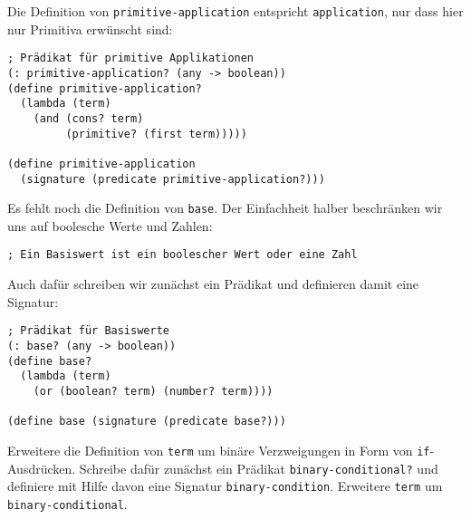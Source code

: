 %
Die Definition von \lstinline{primitive-application} entspricht
\lstinline{application}, nur dass hier nur Primitiva erwünscht sind:
%
\begin{lstlisting}
; Prädikat für primitive Applikationen
(: primitive-application? (any -> boolean))
(define primitive-application?
  (lambda (term)
    (and (cons? term)
         (primitive? (first term)))))

(define primitive-application 
  (signature (predicate primitive-application?)))
\end{lstlisting}
%
Es fehlt noch die Definition von \lstinline{base}.  Der Einfachheit
halber beschränken wir uns auf boolesche Werte und Zahlen:\label{page:basiswert}
%
\begin{lstlisting}
; Ein Basiswert ist ein boolescher Wert oder eine Zahl
\end{lstlisting}
%
Auch dafür schreiben wir zunächst ein Prädikat und definieren damit
eine Signatur:
%
\begin{lstlisting}
; Prädikat für Basiswerte
(: base? (any -> boolean))
(define base?
  (lambda (term)
    (or (boolean? term) (number? term))))

(define base (signature (predicate base?)))
\end{lstlisting}

\begin{aufgabeinline}
  Erweitere die Definition von \lstinline{term} um binäre
  Verzweigungen in Form von \lstinline{if}-Ausdrücken.  Schreibe dafür
  zunächst ein Prädikat \lstinline{binary-conditional?} und definiere
  mit Hilfe davon eine Signatur \lstinline{binary-condition}.
  Erweitere \lstinline{term} um \lstinline{binary-conditional}.
\end{aufgabeinline}

